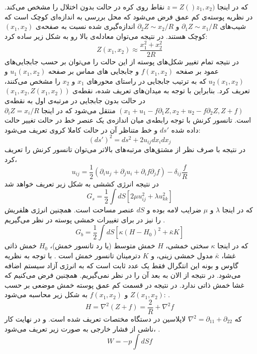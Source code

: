 که در اینجا 
$z=Z()z_1,x_2)$
نقاط روی کره در حالت بدون اختلال را مشخص می‌کند. در نظریه پوسته‌ی کم عمق فرض می‌شود که محل بررسی به اندازه‌ای کوچک است که شیب‌های 
$\partial_1Z\sim x_1/R$
و 
$\partial_2Z\sim x_2/R$
اندازه‌گیری شده نسبت به صفحه‌ی 
$(x_1,x_2)$
کوچک هستند. در نتیجه می‌توان معادله‌ی بالا رو به شکل زیر ساده کرد:
\begin{equation}
Z(x_1,x_2) \approx \frac{x_1^2+x_2^2}{2R}
\label{eq:nelsonS2}
\end{equation}
در نتیجه تمام تغییر شکل‌های پوسته از این حالت را می‌توان بر حسب جابجایی‌های عمود بر صفحه‌
 $f(x_1,x_2)$
و جابجایی های مماس بر صفحه 
$u_1(x_1,x_2)$
و
$u_2(x_1,x_2)$
که به ترتیب جابجایی در راستای محورهای 
$x_1$
و
$x_2$
را مشخص می‌کنند، تعریف کرد. بنابراین با توجه به میدان‌های تعریف شده، نقطه‌ی 
$(x_1,x_2,Z(x_1,x_2))$
در حالت بدون جابجایی در مرتبه‌ی اول به نقطه‌ی 
$(x_1+u_1-f\partial_1Z,x_2+u_2-f\partial_2Z,Z+f)$
منتقل می‌شود که در اینجا 
$\partial_iZ=x_i/R$
است. تانسور کرنش با توجه رابطه‌ی میان اندازه‌ی یک عنصر خط در حالت تغییر حالت داده شده
$ds'$
و خط متناظر آن در حالت کاملا کروی تعریف می‌شود:
\begin{equation}
(ds')^2=ds^2+2u_{ij}dx_idx_j
\label{eq:nelsonS3}
\end{equation}
در نتیجه با صرف نظر از مشتق‌های مرتبه‌های بالاتر می‌توان تانسور کرنش را تعریف کرد،
\begin{equation}
u_{ij}=\frac{1}{2}(\partial_iu_j+\partial_ju_i+\partial_if\partial_jf)-\delta_{ij}\frac{f}{R}
\label{eq:nelsonS4}
\end{equation}
در نتیجه انرژی کششی به شکل زیر تعریف خواهد شد
\begin{equation}
G_s=\frac{1}{2}\int dS\left[2\mu u_{ij}^2+\lambda u_{kk}^2\right]
\label{eq:nelsonS5}
\end{equation}
  که در اینجا 
$\lambda$
و
$\mu$
ضرایب لامه
بوده و 
$dS$
عنصر مساحت است. همچنین انرژی هلفریش
را نیز در برای تغییرات خمشی پوسته در نظر می‌گیریم
\cite{Helfrich1973}.
\begin{equation}
G_b=\frac{1}{2}\int dS\left[\kappa(H-H_0)^2+\bar\kappa K\right]
\label{eq:nelsonS6}
\end{equation}
  که در اینجا 
$\kappa$
سختی خمشی، 
$H$
خمش متوسط (یا رد
تانسور خمش)،
$H_0$
خمش ذاتی غشا،
$\bar\kappa$
مدول خمشی زینی،
و
$K$
دترمینان تانسور خمش است . با توجه به نظریه گاوس و بونه
این انتگرال فقط یک عدد ثابت است که به انرژی آزاد سیستم اضافه می‌شود. در نتیجه از الان به بعد آن را در نظر نمی‌گیریم. همچنین فرض می‌کنیم که غشا خمش ذاتی ندارد. در نتیجه در قسمت کم عمق پوسته خمش موضعی بر حسب 
$Z(x_1,x_2)$
و 
$f(x_1,x_2)$
به شکل زیر محاسبه می‌شود:
\cite{Helfrich1973}.
\begin{equation}
H =\nabla^2(Z+f)=\frac{2}{R}+\nabla^2f
\label{eq:nelsonS7}
\end{equation}
که 
$\nabla^2=\partial_{11}+\partial_{22}$
لاپلاسین در دستگاه مختصات تعریف شده است. و در نهایت کار ناشی از فشار خارجی به صورت زیر تعریف می‌شود،
\cite{Helfrich1973}.
\begin{equation}
W=-p\int dSf
\label{eq:nelsonS8}
\end{equation}

